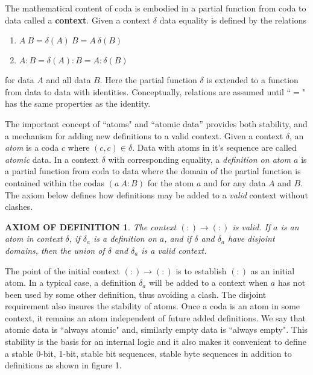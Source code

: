\documentclass[11pt]{article}
\begin{document}
     The mathematical content of coda is embodied in a partial function from coda to data called a {\bf context}.  Given a context $\delta$ data equality is defined by the relations 
\begin{enumerate}
\item[] $A\ B = \delta(A)\ B = A\ \delta(B)$
\item[] $A:B = \delta(A):B = A:\delta(B)$
\end{enumerate}
for data $A$ and all data $B$.  Here the partial function $\delta$ is extended to a function from data to data with identities.  Conceptually, relations are assumed until ``$=$" has the same 
properties as the identity. 
      
    The important concept of ``atoms" and ``atomic data'' provides both stability, and a mechanism for adding new definitions to a valid context.   
Given a context $\delta$, an {\it atom} is a coda $c$ where $(c,c)\in \delta$.  Data with atoms in it's sequence are called {\it atomic} data.  In a context $\delta$ with corresponding equality, 
a {\it definition on atom $a$} is a partial function from coda to data where the domain of the partial function is contained within the codas $(a\ A:B)$ for the atom $a$ and for any data $A$ and $B$.  
The axiom below defines how definitions may be added to a {\it valid} context without clashes.  

\newtheorem*{remark}{AXIOM OF DEFINITION} 

\begin{remark}  The context $(:)\rightarrow(:)$ is valid.  If $a$ is an atom in context $\delta$, if $\delta_a$ is a definition on $a$, and if $\delta$ and $\delta_a$ have disjoint domains, then 
the union of $\delta$ and $\delta_a$ is a valid context. 
\end{remark} 
\noindent The point of the initial context $(:)\rightarrow(:)$ is to establish $(:)$ as an initial atom.  
In a typical case, a definition $\delta_a$ will be added to a context when $a$ has not been used by some other definition, thus 
avoiding a clash.  The disjoint requirement also insures the stability of atoms.  Once a coda is an atom in some context, it remains an atom independent of future added definitions.   
We say that atomic data is ``always atomic" and, similarly empty data is ``always empty".  This stability is the basis for an internal logic and it also makes 
it convenient to define a stable 0-bit, 1-bit, stable bit sequences, stable byte sequences in addition to definitions as shown in figure 1.  
\end{document}
